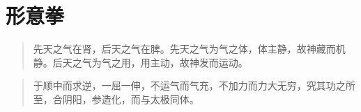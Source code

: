 \chapter{形意拳}

\begin{quote}
  先天之气在肾，后天之气在脾。先天之气为气之体，体主静，故神藏而机静。后天之气为气之用，用主动，故神发而运动。
\end{quote}

\begin{quote}
于顺中而求逆，一屈一伸，不运气而气充，不加力而力大无穷，究其功之所至，合阴阳，参造化，而与太极同体。
\end{quote}
